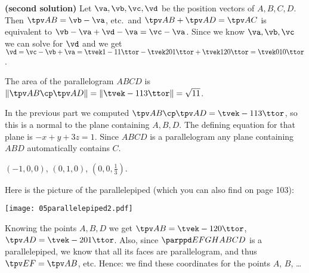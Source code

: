 \textbf{(second solution)} Let $\va, \vb, \vc, \vd$ be the position vectors of $A,B,C,D$.
Then $\tpv AB = \vb-\va$, etc.\ and $\tpv AB + \tpv AD = \tpv AC$ is equivalent
to $\vb-\va + \vd-\va = \vc-\va$.  Since we know $\va, \vb, \vc$ we can solve
for $\vd$ and we get
$\vd = \vc-\vb+\va = \tvek1\\-1\\1\ttor - \tvek2\\0\\1\ttor + \tvek1\\2\\0\ttor
= \tvek0\\1\\0\ttor$.
\bigskip

\item[{\bfseries(VI13.7b)}]

The area of the parallelogram $ABCD$ is $\|\tpv AB \cp \tpv AD\| =
\left\|\tvek-1\\1\\3\ttor\right\| = \sqrt{11}$.
\bigskip

\item[{\bfseries(VI13.7c)}]

In the previous part we computed $\tpv AB \cp \tpv AD = \tvek-1\\1\\3\ttor$, so
this is a normal to the plane containing $A,B,D$.  The defining equation for
that plane is $-x+y+3z = 1$.  Since $ABCD$ is a parallelogram any plane
containing $ABD$ automatically contains $C$.
\bigskip

\item[{\bfseries(VI13.7d)}]

$(-1,0,0)$, $(0,1,0)$, $(0,0,\frac{1}{3})$.
\bigskip

\item[{\bfseries(VI13.8a)}]
 Here is the picture of the parallelepiped (which you can also find on
page 103):
\begin{center}
  \texttt{[image: 05parallelepiped2.pdf]}
\end{center}
Knowing the points $A, B, D$ we get $\tpv AB = \tvek-1\\2\\0\ttor$,
$\tpv AD = \tvek-2\\0\\1\ttor$.  Also, since $\parppd EFGHABCD$ is a
parallelepiped, we know that all its faces are parallelogram, and thus $\tpv EF
= \tpv AB$, etc.  Hence: we find these coordinates for the points $A$,
$B$, \dots

